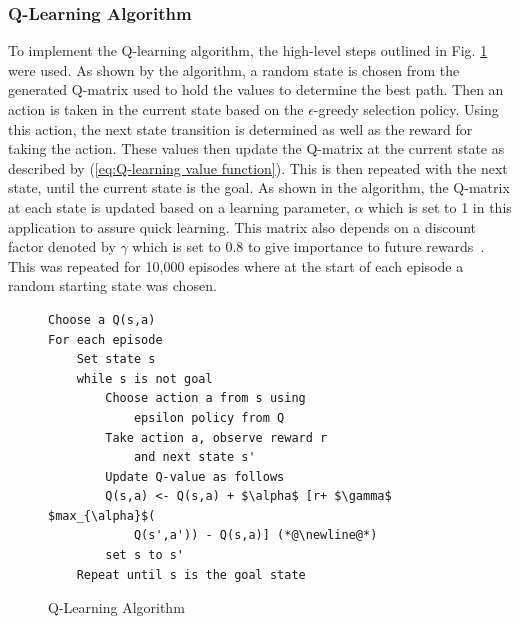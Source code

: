 \documentclass[12pt,american]{report}
\begin{document}
\subsubsection{Q-Learning Algorithm}
To implement the Q-learning algorithm, the high-level steps outlined in Fig. \ref{fig:q-learning} were used.  As shown by the algorithm, a random state is chosen from the generated Q-matrix used to hold the values to determine the best path.  Then an action is taken in the current state based on the \begin{math}\epsilon\end{math}-greedy selection policy.  Using this action, the next state transition is determined as well as the reward for taking the action.  These values then update the Q-matrix at the current state as described by (\ref{eq:Q-learning value function}). This is then repeated with the next state, until the current state is the goal. As shown in the algorithm, the Q-matrix at each state is updated based on a learning parameter, \begin{math}\alpha\end{math} which is set to 1 in this application to assure quick learning. This matrix also depends on a discount factor denoted by \begin{math}\gamma\end{math} which is set to 0.8 to give importance to future rewards~\cite{Eden}. This was repeated for 10,000 episodes where at the start of each episode a random starting state was chosen. 
\begin{figure}
\centering
\begin{lstlisting}[frame=single]
Choose a Q(s,a)
For each episode
    Set state s
    while s is not goal
        Choose action a from s using 
            epsilon policy from Q
        Take action a, observe reward r 
            and next state s'
        Update Q-value as follows
        Q(s,a) <- Q(s,a) + $\alpha$ [r+ $\gamma$ $max_{\alpha}$(
            Q(s',a')) - Q(s,a)] (*@\newline@*)
        set s to s'
    Repeat until s is the goal state
\end{lstlisting}
\caption{Q-Learning Algorithm~\cite{Eden}}
\label{fig:q-learning}
\end{figure}
\end{document}
